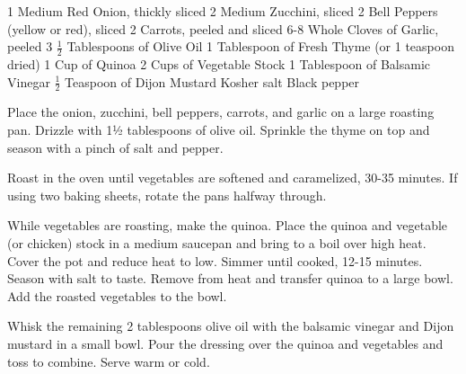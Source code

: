 \begin{ingreds}
    1 Medium Red Onion, thickly sliced
    2 Medium Zucchini, sliced
    2 Bell Peppers (yellow or red), sliced
    2 Carrots, peeled and sliced
    6-8 Whole Cloves of Garlic, peeled
    3 \(\frac{1}{2}\) Tablespoons of Olive Oil
    1 Tablespoon of Fresh Thyme (or 1 teaspoon dried)
    1 Cup of Quinoa
    2 Cups of Vegetable Stock
    1 Tablespoon of Balsamic Vinegar
    \(\frac{1}{2}\) Teaspoon of Dijon Mustard
    Kosher salt
    Black pepper
\end{ingreds}
\vspace{.5in}
\begin{method}
     Place the onion, zucchini, bell peppers, carrots, and garlic on a large roasting pan. Drizzle with 1½ tablespoons of olive oil. Sprinkle the thyme on top and season with a pinch of salt and pepper.
     
Roast in the oven until vegetables are softened and caramelized, 30-35 minutes. If using two baking sheets, rotate the pans halfway through.
    
    While vegetables are roasting, make the quinoa. Place the quinoa and vegetable (or chicken) stock in a medium saucepan and bring to a boil over high heat. Cover the pot and reduce heat to low. Simmer until cooked, 12-15 minutes. Season with salt to taste. Remove from heat and transfer quinoa to a large bowl. Add the roasted vegetables to the bowl.
    
    Whisk the remaining 2 tablespoons olive oil with the balsamic vinegar and Dijon mustard in a small bowl. Pour the dressing over the quinoa and vegetables and toss to combine. Serve warm or cold.
\end{method}